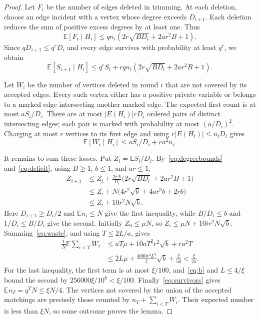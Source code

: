 \documentclass[11pt]{article}
\newcommand{\E}{\mathbb E}
\begin{document}
\begin{proof}
Let $F_i$ be the number of edges deleted in trimming. At each deletion, choose an edge
 incident with a vertex whose degree exceeds $D_{i+1}$. Each deletion reduces the sum of
 positive excess degrees by at least one. Thus
\[
 \E[F_i\mid H_i]\le qn_i(2r\sqrt{BD_i}+2ar^2B+1).
\]
Since $qD_{i+1}\le q^rD_i$ and every edge survives with probability at least $q^r$, we obtain
\begin{equation}\label{eq:deficit}
 \E[S_{i+1}\mid H_i]
 \le q^rS_i+rq n_i(2r\sqrt{BD_i}+2ar^2B+1).
\end{equation}

Let $W_i$ be the number of vertices deleted in round $i$ that are not covered by its
 accepted edges. Every such vertex either has a positive private variable or belongs to
 a marked edge intersecting another marked edge. The expected first count is at most
 $aS_i/D_i$. There are at most $|E(H_i)|rD_i$ ordered pairs of distinct intersecting
 edges; each pair is marked with probability at most $(a/D_i)^2$. Charging at most $r$
 vertices to its first edge and using $r|E(H_i)|\le n_iD_i$ gives
\begin{equation}\label{eq:waste}
 \E[W_i\mid H_i]\le aS_i/D_i+ra^2n_i.
\end{equation}

It remains to sum these losses. Put $Z_i=\E S_i/D_i$. By~\eqref{eq:degreebounds}
 and~\eqref{eq:deficit}, using $B\ge1$, $b\le1$, and $ar\le1$,
\[
 \begin{aligned}
 Z_{i+1}
 &\le Z_i+
  \frac{2rN}{D_i}\bigl(2r\sqrt{BD_i}+2ar^2B+1\bigr)\\
 &\le Z_i+
  N\bigl(4r^2\sqrt b+4ar^3b+2rb\bigr)\\
 &\le Z_i+10r^2N\sqrt b.
 \end{aligned}
\]
Here $D_{i+1}\ge D_i/2$ and $\E n_i\le N$ give the first
inequality, while $B/D_i\le b$ and $1/D_i\le B/D_i$ give the second.
Initially $Z_0\le\mu N$, so $Z_i\le\mu N+10ir^2N\sqrt b$. Summing~\eqref{eq:waste}, and
 using $T\le2L/a$, gives
\begin{align*}
 \frac1N\E\sum_{i<T}W_i
 &\le aT\mu+10aT^2r^2\sqrt b+ra^2T\\
 &\le2L\mu+\frac{4000r^3L^3}{\xi}\sqrt b+\frac{\xi}{50}
 <\frac{\xi}{25}.
\end{align*}
For the last inequality, the first term is at most $\xi/100$, and~\eqref{eq:b} and
 $L\le4/\xi$ bound the second by $256000\xi/10^8<\xi/100$. Finally~\eqref{eq:survivors}
 gives $\E n_T=q^TN\le\xi N/4$. The vertices not covered by the union of the accepted
 matchings are precisely those counted by $n_T+\sum_{i<T}W_i$. Their expected number is
 less than $\xi N$, so some outcome proves the lemma.
\end{proof}
\end{document}
